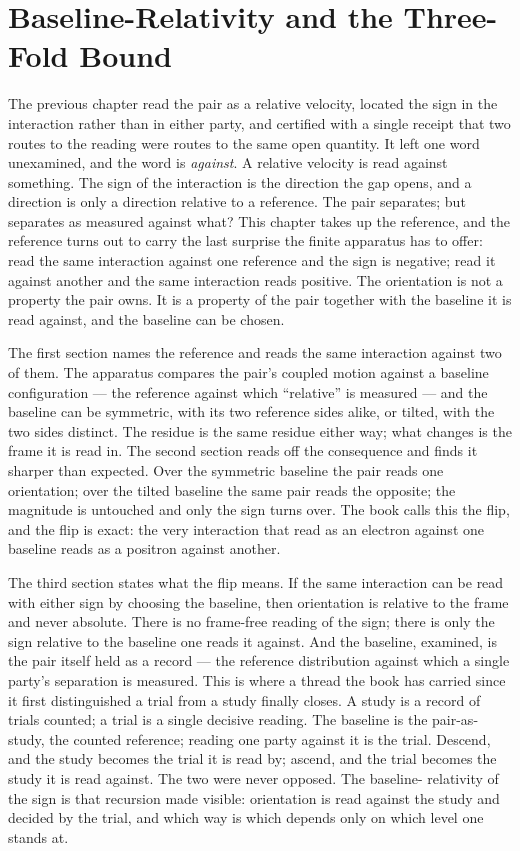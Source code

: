 \chapter{Baseline-Relativity and the Three-Fold Bound}

The previous chapter read the pair as a relative velocity, located the sign in the
interaction rather than in either party, and certified with a single receipt that two
routes to the reading were routes to the same open quantity. It left one word
unexamined, and the word is \emph{against}. A relative velocity is read against
something. The sign of the interaction is the direction the gap opens, and a direction
is only a direction relative to a reference. The pair separates; but separates as
measured against what? This chapter takes up the reference, and the reference turns out
to carry the last surprise the finite apparatus has to offer: read the same interaction
against one reference and the sign is negative; read it against another and the same
interaction reads positive. The orientation is not a property the pair owns. It is a
property of the pair together with the baseline it is read against, and the baseline can
be chosen.

The first section names the reference and reads the same interaction against two of them.
The apparatus compares the pair's coupled motion against a baseline configuration --- the
reference against which ``relative'' is measured --- and the baseline can be symmetric, with
its two reference sides alike, or tilted, with the two sides distinct. The residue is the
same residue either way; what changes is the frame it is read in. The second section reads
off the consequence and finds it sharper than expected. Over the symmetric baseline the
pair reads one orientation; over the tilted baseline the same pair reads the opposite; the
magnitude is untouched and only the sign turns over. The book calls this the flip, and the
flip is exact: the very interaction that read as an electron against one baseline reads as a
positron against another.

The third section states what the flip means. If the same interaction can be read with
either sign by choosing the baseline, then orientation is relative to the frame and never
absolute. There is no frame-free reading of the sign; there is only the sign relative to
the baseline one reads it against. And the baseline, examined, is the pair itself held as a
record --- the reference distribution against which a single party's separation is measured.
This is where a thread the book has carried since it first distinguished a trial from a
study finally closes. A study is a record of trials counted; a trial is a single decisive
reading. The baseline is the pair-as-study, the counted reference; reading one party against
it is the trial. Descend, and the study becomes the trial it is read by; ascend, and the
trial becomes the study it is read against. The two were never opposed. The baseline-
relativity of the sign is that recursion made visible: orientation is read against the
study and decided by the trial, and which way is which depends only on which level one
stands at.

